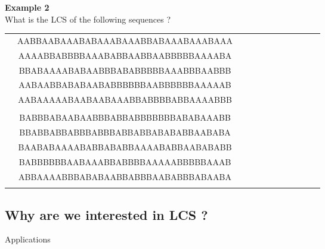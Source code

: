 \documentclass{beamer}
\begin{document}
\begin{frame}[t]
  \textbf{Example 2}\\
  What is the LCS of the following sequences ?
  \begin{center}
    \begin{tabular}{rccccccccccc}
      \only<2>{
        $S_3$ :
       & AABBAABAAABABAAABAAABBABAAABAAABAAA \\
       & AAAABBABBBBAAABABBAABBAABBBBBAAAABA \\
       & BBABAAAABABAABBBABABBBBBAAABBBAABBB \\
       & AABAABBABABAABABBBBBBAABBBBBBAAAAAB \\
       & AABAAAAABAABAABAAABBABBBBABBAAAABBB \\
      }                                      \\
      \only<2>{
        $S_4$ :
       & BABBBABAABAABBBABBABBBBBBBABABAAABB \\
       & BBABBABBABBBABBBABBABBABABABBAABABA \\
       & BAABABAAAABABBABABBAAAABABBAABABABB \\
       & BABBBBBBAABAAABBABBBBAAAAABBBBBAAAB \\
       & ABBAAAABBBABABAABBABBBAABABBBABAABA \\
      }
    \end{tabular}
  \end{center}
\end{frame}

\subsection{Why are we interested in LCS ?}

\begin{frame}[standout]
  Applications
\end{frame}
\end{document}
